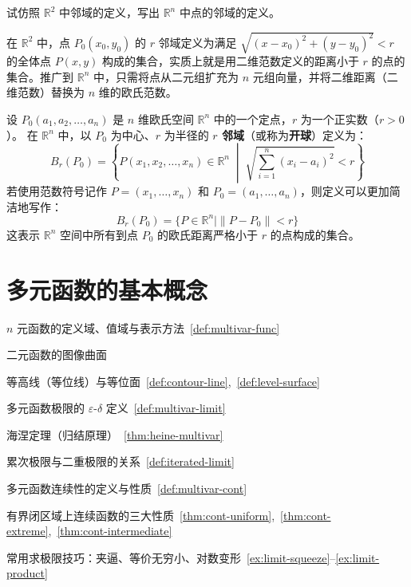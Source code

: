 \documentclass[lang=cn,11pt]{elegantbook}
\begin{document}
\begin{exercise}[邻域概念的高维推广]
试仿照 $\mathbb{R}^2$ 中邻域的定义，写出 $\mathbb{R}^n$ 中点的邻域的定义。
\end{exercise}
\begin{note}
在 $\mathbb{R}^2$ 中，点 $P_0(x_0, y_0)$ 的 $r$ 邻域定义为满足 $\sqrt{(x-x_0)^2+(y-y_0)^2} < r$ 的全体点 $P(x,y)$ 构成的集合，实质上就是用二维范数定义的距离小于 $r$ 的点的集合。推广到 $\mathbb{R}^n$ 中，只需将点从二元组扩充为 $n$ 元组向量，并将二维距离（二维范数）替换为 $n$ 维的欧氏范数。
\end{note}
\begin{solution}
设 $P_0(a_1, a_2, \dots, a_n)$ 是 $n$ 维欧氏空间 $\mathbb{R}^n$ 中的一个定点，$r$ 为一个正实数（$r>0$）。
在 $\mathbb{R}^n$ 中，以 $P_0$ 为中心、$r$ 为半径的 \textbf{$r$ 邻域}（或称为\textbf{开球}）定义为：
\[
B_r(P_0) = \left\{ P(x_1, x_2, \dots, x_n) \in \mathbb{R}^n \;\middle|\; \sqrt{\sum_{i=1}^n (x_i - a_i)^2} < r \right\}
\]
若使用范数符号记作 $P=(x_1, \dots, x_n)$ 和 $P_0=(a_1, \dots, a_n)$，则定义可以更加简洁地写作：
\[
B_r(P_0) = \bigl\{ P \in \mathbb{R}^n \mid \|P - P_0\| < r \bigr\}
\]
这表示 $\mathbb{R}^n$ 空间中所有到点 $P_0$ 的欧氏距离严格小于 $r$ 的点构成的集合。
\end{solution}



\section{多元函数的基本概念}

\begin{introduction}
  \item $n$ 元函数的定义域、值域与表示方法~\ref{def:multivar-func}
  \item 二元函数的图像曲面
  \item 等高线（等位线）与等位面~\ref{def:contour-line},~\ref{def:level-surface}
  \item 多元函数极限的 $\varepsilon$-$\delta$ 定义~\ref{def:multivar-limit}
  \item 海涅定理（归结原理）~\ref{thm:heine-multivar}
  \item 累次极限与二重极限的关系~\ref{def:iterated-limit}
  \item 多元函数连续性的定义与性质~\ref{def:multivar-cont}
  \item 有界闭区域上连续函数的三大性质~\ref{thm:cont-uniform},~\ref{thm:cont-extreme},~\ref{thm:cont-intermediate}
  \item 常用求极限技巧：夹逼、等价无穷小、对数变形~\ref{ex:limit-squeeze}--\ref{ex:limit-product}
\end{introduction}
\end{document}
